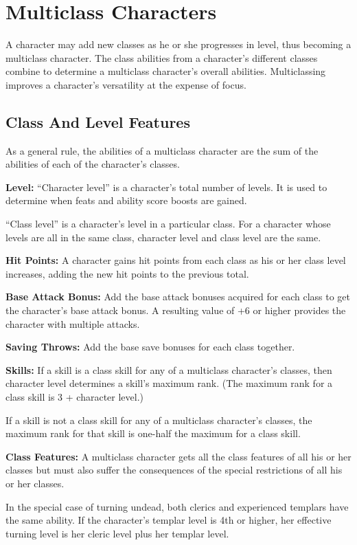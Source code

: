 \section{Multiclass Characters}
A character may add new classes as he or she progresses in level, thus becoming a multiclass character. The class abilities from a character's different classes combine to determine a multiclass character's overall abilities. Multiclassing improves a character's versatility at the expense of focus.

\subsection{Class And Level Features}
As a general rule, the abilities of a multiclass character are the sum of the abilities of each of the character's classes.

\textbf{Level:} ``Character level'' is a character's total number of levels. It is used to determine when feats and ability score boosts are gained.

``Class level'' is a character's level in a particular class. For a character whose levels are all in the same class, character level and class level are the same.

\textbf{Hit Points:} A character gains hit points from each class as his or her class level increases, adding the new hit points to the previous total.

\textbf{Base Attack Bonus:} Add the base attack bonuses acquired for each class to get the character's base attack bonus. A resulting value of +6 or higher provides the character with multiple attacks.

\textbf{Saving Throws:} Add the base save bonuses for each class together.

\textbf{Skills:} If a skill is a class skill for any of a multiclass character's classes, then character level determines a skill's maximum rank. (The maximum rank for a class skill is 3 + character level.)

If a skill is not a class skill for any of a multiclass character's classes, the maximum rank for that skill is one-half the maximum for a class skill.

\textbf{Class Features:} A multiclass character gets all the class features of all his or her classes but must also suffer the consequences of the special restrictions of all his or her classes.

In the special case of turning undead, both clerics and experienced templars have the same ability. If the character's templar level is 4th or higher, her effective turning level is her cleric level plus her templar level.

